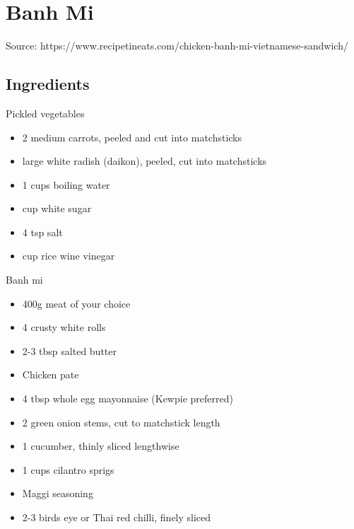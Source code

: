 \section{Banh Mi}


Source: https://www.recipetineats.com/chicken-banh-mi-vietnamese-sandwich/

\subsection{Ingredients}

\begin{multicols}{2}
    Pickled vegetables

    \begin{itemize}
        \item 2 medium carrots, peeled and cut into matchsticks
        \item {} large white radish (daikon), peeled, cut into matchsticks
        \item 1 cups boiling water
        \item {} cup white sugar
        \item 4 tsp salt
        \item {} cup rice wine vinegar
    \end{itemize}

    \vfill\null
    \columnbreak

    Banh mi

    \begin{itemize}
        \item 400g meat of your choice
        \item 4 crusty white rolls
        \item 2-3 tbsp salted butter
        \item Chicken pate
        \item 4 tbsp whole egg mayonnaise (Kewpie preferred)
        \item 2 green onion stems, cut to matchstick length
        \item 1 cucumber, thinly sliced lengthwise
        \item 1 cups cilantro sprigs
        \item Maggi seasoning
        \item 2-3 birds eye or Thai red chilli, finely sliced
    \end{itemize}
\end{multicols}

